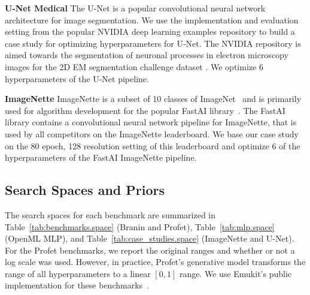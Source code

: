 \textbf{U-Net Medical}\quad
The U-Net \citep{ronne2015unet} is a popular convolutional neural network architecture for image segmentation. We use the implementation and evaluation setting from the popular NVIDIA deep learning examples repository \citep{nvidiaexamples} to build a case study for optimizing hyperparameters for U-Net. The NVIDIA repository is aimed towards the segmentation of neuronal processes in electron microscopy images for the 2D EM segmentation challenge dataset \citep{unetdata1,unetdata2}. We optimize 6 hyperparameters of the U-Net pipeline.


\textbf{ImageNette}\quad
ImageNette \citep{imagenette} is a subset of 10 classes of ImageNet~\citep{deng2009imagenet} and is primarily used for algorithm development for the popular FastAI library~\citep{howard2018fastai}. The FastAI library contains a convolutional neural network pipeline for ImageNette, that is used by all competitors on the ImageNette leaderboard. We base our case study on the 80 epoch, 128 resolution setting of this leaderboard and optimize 6 of the hyperparameters of the FastAI ImageNette pipeline.


\subsection{Search Spaces and Priors}
The search spaces for each benchmark are summarized in Table~\ref{tab:benchmarks.space} (Branin and Profet), Table~\ref{tab:mlp.space} (OpenML MLP), and Table~\ref{tab:case_studies.space} (ImageNette and U-Net). For the Profet benchmarks, we report the original ranges and whether or not a log scale was used. However, in practice, Profet's generative model transforms the range of all hyperparameters to a linear $[0, 1]$ range. We use Emukit's public implementation for these benchmarks~\citep{emukit2019}.


